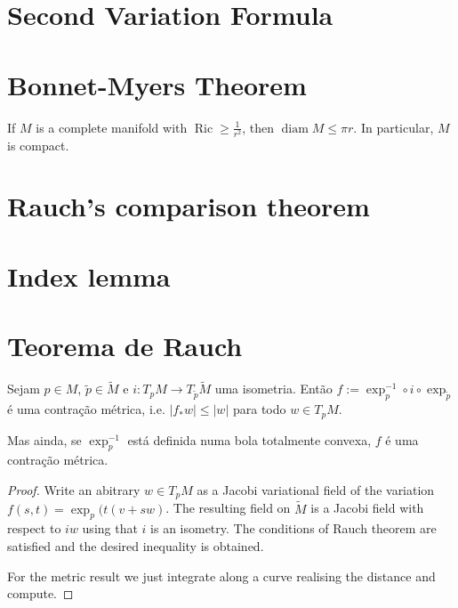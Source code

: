 \section{Second Variation Formula}
\label{section-second-variation}


\section{Bonnet-Myers Theorem}
\label{subsection-Bonnet-Myers-theorem}

\begin{theorem}
\label{theorem-bonnet-myers}
If $M$ is a complete manifold with $\operatorname{Ric} \geq \frac{1}{r^2}$, then
$\operatorname{diam}M\leq \pi r$. In particular, $M$ is compact.
\end{theorem}

\section{Rauch's comparison theorem}
\label{section-Rauch}

\section{Index lemma}
\label{subsection-index-lemma}

\section{Teorema de Rauch}
\label{subsection-Rauch}

\begin{theorem}[Rauch]
\label{theorem-Rauch}
\end{theorem}

\begin{proposition}
\label{proposition-contraction}
Sejam $p \in M$, $\tilde{p} \in \tilde{M}$ e $i:T_pM \to T_{\tilde{p}}\tilde{M}$
uma isometria. Então $f:=\operatorname{exp}^{-1}_p \circ i \circ
\operatorname{exp}_{\tilde{p}}$ é uma contração métrica, i.e. $|f_*w|\leq |w|$
para todo $w \in T_pM$.

Mas ainda, se $\operatorname{exp}_p^{-1}$ está definida numa bola totalmente
convexa, $f$ é uma contração métrica.
\end{proposition}

\begin{proof}
Write an abitrary $w\in T_p M$ as a Jacobi variational field of the variation 
$f(s,t)=\operatorname{exp}_p(t(v+sw)$. The resulting field on $\tilde{M}$ is a
Jacobi field with respect to $iw$ using that $i$ is an isometry. The conditions
of Rauch theorem are satisfied and the desired inequality is obtained.

For the metric result we just integrate along a curve realising the distance and
compute.
\end{proof}

